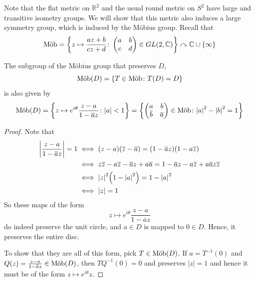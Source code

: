 \documentclass[a4paper]{article}
\begin{document}
Note that the flat metric on \( \mathbb R^2 \) and the usual round metric on \( S^2 \) have large and transitive isometry groups.
We will show that this metric also induces a large symmetry group, which is induced by the M\"obius group.
Recall that
\[
	\text{M\"ob} = \qty{z \mapsto \frac{az+b}{cz+d} \colon \begin{pmatrix}
			a & b \\
			c & d
		\end{pmatrix} \in GL(2,\mathbb C)} \curvearrowright \mathbb C \cup \qty{\infty}
\]
\begin{lemma}
	The subgroup of the M\"obius group that preserves \( D \),
	\[
		\text{M\"ob}(D) = \qty{T \in \text{M\"ob}\colon T(D) = D}
	\]
	is also given by
	\[
		\text{M\"ob}(D) = \qty{z \mapsto e^{i\theta} \frac{z-a}{1-\overline a z} \colon \abs{a} < 1} = \qty{\begin{pmatrix}
				a           & b           \\
				\overline b & \overline a
			\end{pmatrix} \in \text{M\"ob}\colon \abs{a}^2 - \abs{b}^2 = 1}
	\]
\end{lemma}
\begin{proof}
	Note that
	\begin{align*}
		\abs{\frac{z-a}{1-\overline a z}} = 1 & \iff (z-a)(\overline z - \overline a) = (1 - \overline a z)(1 - a \overline z)                                                     \\
		                                      & \iff z\overline z - a\overline z - \overline a z + a \overline a = 1 - \overline a z - a \overline z + a \overline a z \overline z \\
		                                      & \iff \abs{z}^2\qty(1 - \abs{a}^2) = 1 - \abs{a}^2                                                                                  \\
		                                      & \iff \abs{z} = 1
	\end{align*}
	So these maps of the form
	\[
		z \mapsto e^{i\theta} \frac{z-a}{1-\overline a z}
	\]
	do indeed preserve the unit circle, and \( a \in D \) is mapped to \( 0 \in D \).
	Hence, it preserves the entire disc.

	To show that they are all of this form, pick $T\in \text{M\"ob}(D)$. If $ a = T^{-1}(0) $ and $Q(z) = \frac{z-a}{1-\overline{a}z}\in \text{M\"ob}(D)$, then $ TQ^{-1}(0) = 0 $ and preserves $|z|=1$ and hence it must be of the form $z \mapsto e^{i \theta}z$.  
\end{proof}
\end{document}
